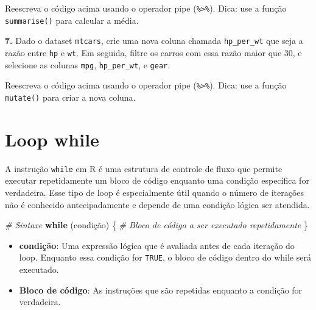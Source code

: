 \documentclass[
]{book}
\newenvironment{Shaded}{\begin{snugshade}}{\end{snugshade}}
\newcommand{\CommentTok}[1]{\textcolor[rgb]{0.56,0.35,0.01}{\textit{#1}}}
\newcommand{\ControlFlowTok}[1]{\textcolor[rgb]{0.13,0.29,0.53}{\textbf{#1}}}
\newcommand{\DecValTok}[1]{\textcolor[rgb]{0.00,0.00,0.81}{#1}}
\newcommand{\FunctionTok}[1]{\textcolor[rgb]{0.13,0.29,0.53}{\textbf{#1}}}
\newcommand{\NormalTok}[1]{#1}
\newcommand{\OtherTok}[1]{\textcolor[rgb]{0.56,0.35,0.01}{#1}}
\newcommand{\SpecialCharTok}[1]{\textcolor[rgb]{0.81,0.36,0.00}{\textbf{#1}}}
\begin{document}
Reescreva o código acima usando o operador pipe (\texttt{\%\textgreater{}\%}). Dica: use a função \texttt{summarise()} para calcular a média.

\textbf{7.} Dado o dataset \texttt{mtcars}, crie uma nova coluna chamada \texttt{hp\_per\_wt} que seja a razão entre \texttt{hp} e \texttt{wt}. Em seguida, filtre os carros com essa razão maior que 30, e selecione as colunas \texttt{mpg}, \texttt{hp\_per\_wt}, e \texttt{gear}.

\begin{Shaded}
\end{Shaded}

Reescreva o código acima usando o operador pipe (\texttt{\%\textgreater{}\%}). Dica: use a função \texttt{mutate()} para criar a nova coluna.

\chapter{Loop while}\label{loop-while}

A instrução \texttt{while} em R é uma estrutura de controle de fluxo que
permite executar repetidamente um bloco de código enquanto uma condição
específica for verdadeira. Esse tipo de loop é especialmente útil quando
o número de iterações não é conhecido antecipadamente e depende de uma
condição lógica ser atendida.

\begin{Shaded}
\begin{Highlighting}[]
\CommentTok{\# Sintaxe}
\ControlFlowTok{while}\NormalTok{ (condição) \{}
  \CommentTok{\# Bloco de código a ser executado repetidamente}
\NormalTok{\}}
\end{Highlighting}
\end{Shaded}

\begin{itemize}
\item
  \textbf{condição}: Uma expressão lógica que é avaliada antes de cada
  iteração do loop. Enquanto essa condição for \texttt{TRUE}, o bloco de
  código dentro do while será executado.
\item
  \textbf{Bloco de código}: As instruções que são repetidas enquanto a
  condição for verdadeira.
\end{itemize}
\end{document}
